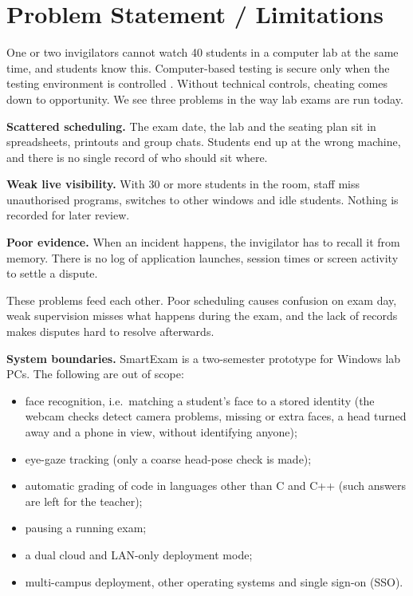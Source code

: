 \section{Problem Statement / Limitations}

One or two invigilators cannot watch 40 students in a computer lab at the same time, and students know this. Computer-based testing is secure only when the testing environment is controlled \cite{mit_cbt,zilles2019}. Without technical controls, cheating comes down to opportunity. We see three problems in the way lab exams are run today.

\textbf{Scattered scheduling.} The exam date, the lab and the seating plan sit in spreadsheets, printouts and group chats. Students end up at the wrong machine, and there is no single record of who should sit where.

\textbf{Weak live visibility.} With 30 or more students in the room, staff miss unauthorised programs, switches to other windows and idle students. Nothing is recorded for later review.

\textbf{Poor evidence.} When an incident happens, the invigilator has to recall it from memory. There is no log of application launches, session times or screen activity to settle a dispute.

These problems feed each other. Poor scheduling causes confusion on exam day, weak supervision misses what happens during the exam, and the lack of records makes disputes hard to resolve afterwards.

\textbf{System boundaries.} SmartExam is a two-semester prototype for Windows lab PCs. The following are out of scope:
\begin{itemize}[noitemsep]
\item face recognition, i.e.\ matching a student's face to a stored identity (the webcam checks detect camera problems, missing or extra faces, a head turned away and a phone in view, without identifying anyone);
\item eye-gaze tracking (only a coarse head-pose check is made);
\item automatic grading of code in languages other than C and C++ (such answers are left for the teacher);
\item pausing a running exam;
\item a dual cloud and LAN-only deployment mode;
\item multi-campus deployment, other operating systems and single sign-on (SSO).
\end{itemize}
